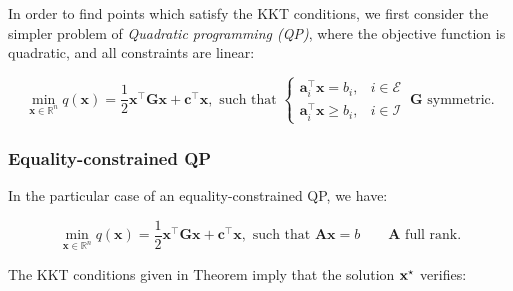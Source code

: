 In order to find points which satisfy the KKT conditions, we first
consider the simpler problem of \emph{Quadratic programming (QP)},
where the objective function is quadratic, and all constraints are
linear:

\begin{equation}
\label{eq:chap3-qp}
\min_{\mathbf{x} \in \mathbb R^n}
q(\mathbf{x})=\frac{1}{2}\mathbf{x}^{\top}\mathbf{G}\mathbf{x}
+\mathbf{c}^{\top}\mathbf{x},\text{ such that }
\left\{\begin{array}{cc}
\mathbf{a}_i^{\top}\mathbf{x} = b_i, & i \in \mathcal{E} \\%
\mathbf{a}_i^{\top}\mathbf{x} \ge b_i, & i \in \mathcal{I} %
\end{array}\right. ~\mathbf{G}\text{ symmetric.}
\end{equation}

\subsubsection{Equality-constrained QP}

In the particular case of an equality-constrained QP, we have:

\begin{equation}
\label{eq:chap3-qp-eq}
\min_{\mathbf{x} \in \mathbb R^n}
q(\mathbf{x})=\frac{1}{2}\mathbf{x}^{\top}\mathbf{G}\mathbf{x}
+\mathbf{c}^{\top}\mathbf{x},\text{ such that }
\mathbf{A}\mathbf{x} = b
\qquad \mathbf{A} \text{ full rank.}
\end{equation}

The KKT conditions given in Theorem  imply that the
solution $\mathbf{x}^{\star}$ verifies:

